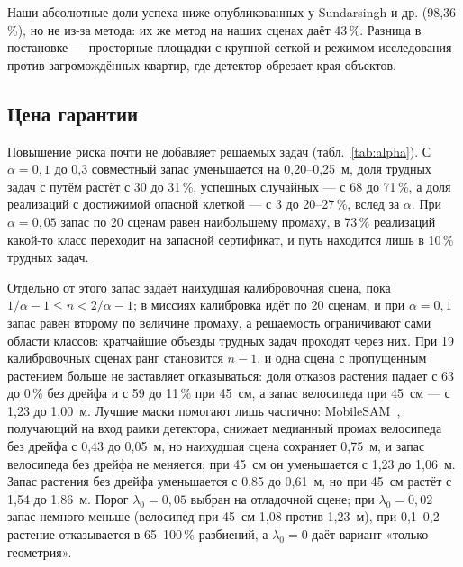 Наши абсолютные доли успеха ниже опубликованных у Sundarsingh и др. (98,36\,\%), но не из-за метода: их же метод на наших сценах даёт 43\,\%. Разница в постановке --- просторные площадки с крупной сеткой и режимом исследования против загромождённых квартир, где детектор обрезает края объектов.

\subsection{Цена гарантии}\label{sec:price}

\begin{table}[htbp]
\centering\scriptsize\setlength{\tabcolsep}{3.5pt}
\caption{Уровень риска при дрейфе L3: покрытие и медианный запас совместного варианта, доля разбиений с отказом для растения, доля трудных задач с путём и доля успешных случайных миссий. Покрытие --- по разбиениям 13/8 (при $\alpha = 0{,}05$ --- по всем 210 разбиениям 19/2), миссии --- с калибровкой по 20 сценам}
\label{tab:alpha}

\end{table}

Повышение риска почти не добавляет решаемых задач (табл.~\ref{tab:alpha}). С $\alpha = 0{,}1$ до 0,3 совместный запас уменьшается на 0,20--0,25~м, доля трудных задач с путём растёт с 30 до 31\,\%, успешных случайных --- с 68 до 71\,\%, а доля реализаций с достижимой опасной клеткой --- с 3 до 20--27\,\%, вслед за $\alpha$. При $\alpha = 0{,}05$ запас по 20 сценам равен наибольшему промаху, в 73\,\% реализаций какой-то класс переходит на запасной сертификат, и путь находится лишь в 10\,\% трудных задач.

Отдельно от этого запас задаёт наихудшая калибровочная сцена, пока $1/\alpha - 1 \le n < 2/\alpha - 1$; в миссиях калибровка идёт по 20 сценам, и при $\alpha = 0{,}1$ запас равен второму по величине промаху, а решаемость ограничивают сами области классов: кратчайшие объезды трудных задач проходят через них. При 19 калибровочных сценах ранг становится $n - 1$, и одна сцена с пропущенным растением больше не заставляет отказываться: доля отказов растения падает с 63 до 0\,\% без дрейфа и с 59 до 11\,\% при 45~см, а запас велосипеда при 45~см --- с 1,23 до 1,00~м. Лучшие маски помогают лишь частично: MobileSAM~\cite{mobilesam}, получающий на вход рамки детектора, снижает медианный промах велосипеда без дрейфа с 0,43 до 0,05~м, но наихудшая сцена сохраняет 0,75~м, и запас велосипеда без дрейфа не меняется; при 45~см он уменьшается с 1,23 до 1,06~м. Запас растения без дрейфа уменьшается с 0,85 до 0,61~м, но при 45~см растёт с 1,54 до 1,86~м. Порог $\lambda_0 = 0{,}05$ выбран на отладочной сцене; при $\lambda_0 = 0{,}02$ запас немного меньше (велосипед при 45~см 1,08 против 1,23~м), при 0,1--0,2 растение отказывается в 65--100\,\% разбиений, а $\lambda_0 = 0$ даёт вариант «только геометрия».

